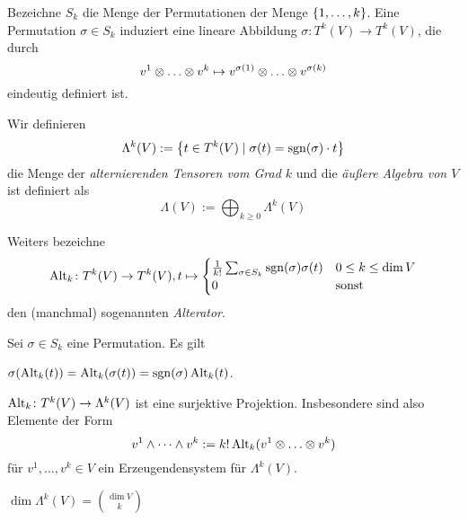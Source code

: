 \begin{definition}
  Bezeichne $S_k$ die Menge der Permutationen der Menge
  $\left\lbrace 1,\dots,k \right\rbrace$. Eine Permutation $\sigma \in S_k$ induziert eine
  lineare Abbildung $\sigma \colon T^k(V) \to T^k(V)$, die durch
  \begin{equation*}
    v^1\tensordots v^k \mapsto v^{\sigma(1)}\tensordots v^{\sigma(k)}
  \end{equation*}
  eindeutig definiert ist.

  Wir definieren
  \begin{equation*}
    \Lambda^k(V) := \left\lbrace  t\in T^k(V) \mid \sigma(t) =
      \operatorname{sgn}(\sigma)\cdot t  \right\rbrace
  \end{equation*}
  die Menge der \emph{alternierenden Tensoren vom Grad $k$} und die
  \emph{äußere Algebra von $V$} ist definiert als
  \begin{equation*}
    \Lambda(V) := \bigoplus_{k\geq 0}\Lambda^k(V)
  \end{equation*}
  

  Weiters bezeichne
  \begin{equation*}
    \operatorname{Alt}_k \colon T^k(V) \to T^k(V), t \mapsto
    \begin{cases}
      \frac{1}{k!}\sum_{\sigma\in S_k} \operatorname{sgn}(\sigma) \sigma(t) & 0\leq
      k \leq \dim V \\
      0 & \text{sonst}
    \end{cases}
  \end{equation*}
  den (manchmal) sogenannten \emph{Alterator}.
\end{definition}

\begin{proposition}
  Sei $\sigma \in S_k$ eine Permutation. Es gilt
  \begin{statements}
  \item $\sigma(\operatorname{Alt}_k(t)) = \operatorname{Alt}_k(\sigma(t)) =
    \operatorname{sgn}(\sigma)\operatorname{Alt}_k(t)$.
  \item $\operatorname{Alt}_k \colon T^k(V) \to \Lambda^k(V)$ ist eine surjektive
    Projektion. Insbesondere sind also Elemente der Form
    \begin{equation*}
      v^1\dotted{\wedge} v^k := k!\Alt_k(v^1\tensordots v^k)
    \end{equation*}
    für $v^1,\dots,v^k\in V$ ein Erzeugendensystem für $\Lambda^k(V)$.
  \item $\dim \Lambda^k(V) = \binom{\dim V}{k}$
  \end{statements}
\end{proposition}

